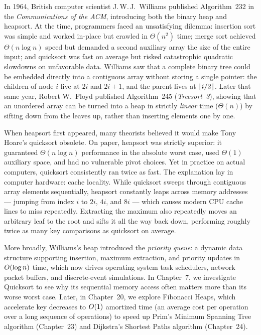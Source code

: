 \begin{historybox}
In 1964, British computer scientist J.\,W.\,J.\ Williams published Algorithm~232 in the
\emph{Communications of the ACM}, introducing both the binary heap and heapsort. At the time,
programmers faced an unsatisfying dilemma: insertion sort was simple and worked in-place but crawled
in $\Theta(n^2)$ time; merge sort achieved $\Theta(n \log n)$ speed but demanded a second auxiliary
array the size of the entire input; and quicksort was fast on average but risked catastrophic
quadratic slowdowns on unfavorable data. Williams saw that a complete binary tree could be embedded
directly into a contiguous array without storing a single pointer: the children of node $i$ live at
$2i$ and $2i+1$, and the parent lives at $\lfloor i/2\rfloor$. Later that same year, Robert W.\ Floyd
published Algorithm~245 (\emph{Treesort~3}), showing that an
unordered array can be turned into a heap in strictly \emph{linear} time ($\Theta(n)$) by sifting
down from the leaves up, rather than inserting elements one by one.

When heapsort first appeared, many theorists believed it would make Tony Hoare's quicksort obsolete.
On paper, heapsort was strictly superior: it guaranteed $\Theta(n \log n)$ performance in the
absolute worst case, used $\Theta(1)$ auxiliary space, and had no vulnerable pivot choices. Yet in
practice on actual computers, quicksort consistently ran twice as fast. The explanation lay
in computer hardware: cache locality. While quicksort sweeps through contiguous
array elements sequentially, heapsort constantly leaps across memory addresses --- jumping from
index $i$ to $2i$, $4i$, and $8i$ --- which causes modern CPU cache lines to miss repeatedly.
Extracting the maximum also repeatedly moves an arbitrary leaf to the root and sifts it all
the way back down, performing roughly twice as many key comparisons as quicksort on average.

More broadly, Williams's heap introduced the \emph{priority queue}: a
dynamic data structure supporting insertion, maximum extraction, and priority updates in
$O(\log n)$ time, which now drives operating system task schedulers,
network packet buffers, and discrete-event simulations. In Chapter~7, we investigate Quicksort to
see why its sequential memory access often matters more than its worse worst case. Later, in
Chapter~20, we explore Fibonacci Heaps, which accelerate key decreases to $O(1)$ amortized time (an average cost per operation over a long sequence of operations)
to speed up Prim's Minimum Spanning Tree algorithm (Chapter~23) and Dijkstra's Shortest Paths
algorithm (Chapter~24).
\end{historybox}

